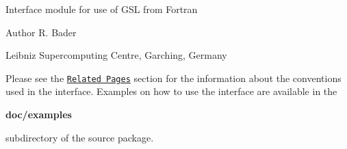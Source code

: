 Interface module for use of G\-S\-L from Fortran \begin{DoxyAuthor}{Author}
R. Bader 

Leibniz Supercomputing Centre, Garching, Germany
\end{DoxyAuthor}
Please see the \href{pages.html}{\tt Related Pages} section for the information about the conventions used in the interface. Examples on how to use the interface are available in the 

{\bfseries doc/examples}

subdirectory of the source package. 